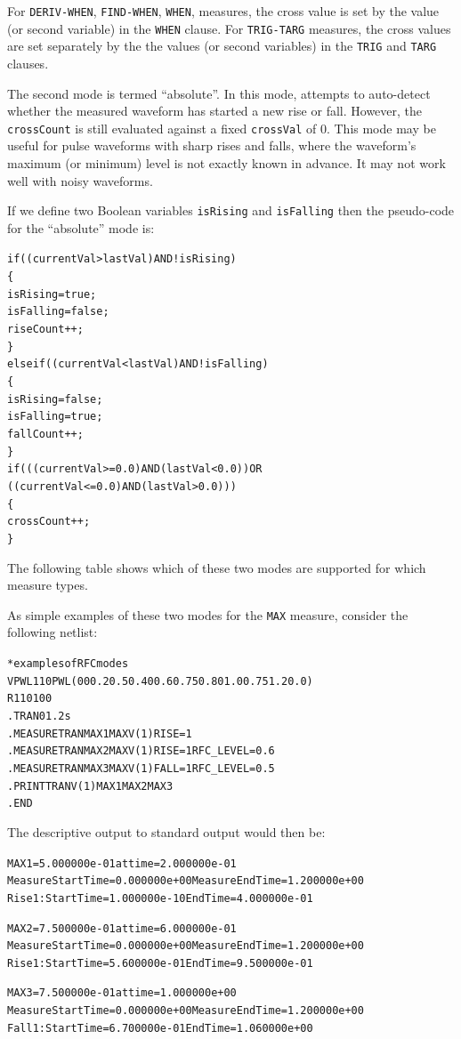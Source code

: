 For \texttt{DERIV-WHEN}, \texttt{FIND-WHEN}, \texttt{WHEN},
measures, the cross value is set by the value (or second variable) in the
\texttt{WHEN} clause. For \texttt{TRIG-TARG} measures, the cross values are
set separately by the the values (or second variables) in the \texttt{TRIG}
and \texttt{TARG} clauses.

The second mode is termed ``absolute''. In this mode, \Xyce{} attempts
to auto-detect whether the measured waveform has started a new rise or
fall. However, the \texttt{crossCount} is still evaluated against a
fixed \texttt{crossVal} of 0.  This mode may be useful for pulse
waveforms with sharp rises and falls, where the waveform's maximum (or
minimum) level is not exactly known in advance.  It may not work well
with noisy waveforms.  

If we define two Boolean variables \texttt{isRising} and \texttt{isFalling} then
the pseudo-code for the ``absolute'' mode is:
\begin{alltt}
if( (currentVal > lastVal) AND !isRising )
\{
  isRising= true;
  isFalling = false;
  riseCount++;
\}
else if( (currentVal < lastVal) AND !isFalling )
\{
  isRising = false;
  isFalling = true;
  fallCount++;
\}
if ( ( (currentVal >= 0.0) AND (lastVal < 0.0) ) OR
     ( (currentVal <= 0.0) AND (lastVal > 0.0) ) )
\{
  crossCount++;
\}
\end{alltt}
The following table shows which of these two modes are supported for which
\Xyce{} measure types.

As simple examples of these two modes for the \texttt{MAX} measure, consider
the following netlist:
\begin{alltt}
*examples of RFC modes
VPWL1  1  0 PWL(0 0 0.2 0.5 0.4 0 0.6 0.75 0.8 0 1.0 0.75 1.2 0.0)
R1  1  0  100
.TRAN 0 1.2s
.MEASURE TRAN MAX1 MAX V(1) RISE=1
.MEASURE TRAN MAX2 MAX V(1) RISE=1 RFC_LEVEL=0.6
.MEASURE TRAN MAX3 MAX V(1) FALL=1 RFC_LEVEL=0.5
.PRINT TRAN V(1) MAX1 MAX2 MAX3
.END
\end{alltt}
The descriptive output to standard output would then be:
\begin{alltt}
MAX1 = 5.000000e-01 at time = 2.000000e-01
Measure Start Time= 0.000000e+00        Measure End Time= 1.200000e+00
Rise 1: Start Time= 1.000000e-10        End Time= 4.000000e-01

MAX2 = 7.500000e-01 at time = 6.000000e-01
Measure Start Time= 0.000000e+00        Measure End Time= 1.200000e+00
Rise 1: Start Time= 5.600000e-01        End Time= 9.500000e-01

MAX3 = 7.500000e-01 at time = 1.000000e+00
Measure Start Time= 0.000000e+00        Measure End Time= 1.200000e+00
Fall 1: Start Time= 6.700000e-01        End Time= 1.060000e+00
\end{alltt}
